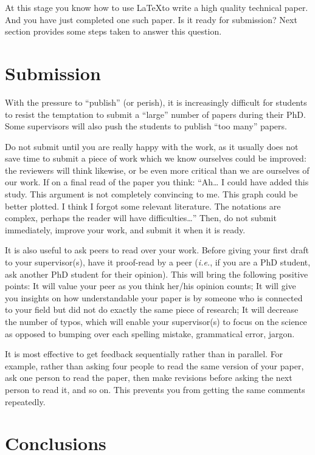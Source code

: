 \documentclass[authoryear,3p,times,preprint,review,fleqn]{elsarticle}
\newcommand{\ie}{\textit{i.e.},\xspace}
\numberwithin{equation}{section}
\theoremstyle{remark}
\begin{document}
At this stage you know how to use \LaTeX to write a high quality technical paper. And you have just completed one such paper. Is it ready for submission? Next section provides some steps taken to answer this question. 


\section{Submission}\label{sec:submission}

With the pressure to “publish” (or perish), it is increasingly difficult for students to resist the temptation to submit a “large” number of papers during their PhD. Some supervisors will also push the students to publish “too many” papers. 

Do not submit until you are really happy with the work, as it usually does not save time to submit a piece of work which we know ourselves could be improved: the reviewers will think likewise, or be even more critical than we are ourselves of our work. If on a final read of the paper you think: “Ah… I could have added this study. This argument is not completely convincing to me. This graph could be better plotted. I think I forgot some relevant literature. The notations are complex, perhaps the reader will have difficulties…” Then, do not submit immediately, improve your work, and submit it when it is ready. 

It is also useful to ask peers to read over your work. Before giving your first draft to your supervisor(s), have it proof-read by a peer (\ie if you are a PhD student, ask another PhD student for their opinion). This will bring the following positive points: 
It will value your peer as you think her/his opinion counts;
It will give you insights on how understandable your paper is by someone who is connected to your field but did not do exactly the same piece of research;
It will decrease the number of typos, which will enable your supervisor(s) to focus on the science as opposed to bumping over each spelling mistake, grammatical error, jargon. 

It is most effective to get feedback sequentially rather than in parallel. For example, rather than asking four people to read the same version of your paper, ask one person to read the paper, then make revisions before asking the next person to read it, and so on. This prevents you from getting the same comments repeatedly.


\section{Conclusions}
\end{document}
